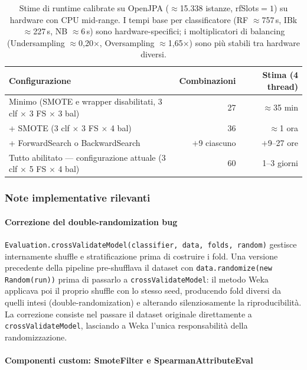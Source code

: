 \begin{table}[h!]
\centering
\small
\begin{tabular}{@{}lrr@{}}
\toprule
\textbf{Configurazione} & \textbf{Combinazioni} & \textbf{Stima (4 thread)} \\
\midrule
Minimo (SMOTE e wrapper disabilitati, 3 clf $\times$ 3 FS $\times$ 3 bal) & 27 & $\approx$35 min \\
+ SMOTE (3 clf $\times$ 3 FS $\times$ 4 bal) & 36 & $\approx$1 ora \\
+ ForwardSearch o BackwardSearch & $+$9 ciascuno & $+$9--27 ore \\
Tutto abilitato --- configurazione attuale (3 clf $\times$ 5 FS $\times$ 4 bal) & 60 & 1--3 giorni \\
\bottomrule
\end{tabular}
\caption{Stime di runtime calibrate su OpenJPA ($\approx$15.338 istanze, rfSlots$=1$) su
hardware con CPU mid-range. I tempi base per classificatore (RF $\approx$757\,s, IBk
$\approx$227\,s, NB $\approx$6\,s) sono hardware-specifici; i moltiplicatori di balancing
(Undersampling $\approx$0{,}20$\times$, Oversampling $\approx$1{,}65$\times$) sono più
stabili tra hardware diversi.}
\end{table}

\subsubsection{Note implementative rilevanti}

\paragraph{Correzione del double-randomization bug}

\texttt{Evaluation.crossValidateModel(classifier, data, folds, random)} gestisce
internamente shuffle e stratificazione prima di costruire i fold. Una versione precedente
della pipeline pre-shufflava il dataset con \texttt{data.randomize(new Random(run))}
prima di passarlo a \texttt{crossValidateModel}: il metodo Weka applicava poi il proprio
shuffle con lo stesso seed, producendo fold diversi da quelli intesi (double-randomization)
e alterando silenziosamente la riproducibilità. La correzione consiste nel passare il
dataset originale direttamente a \texttt{crossValidateModel}, lasciando a Weka l'unica
responsabilità della randomizzazione.

\paragraph{Componenti custom: SmoteFilter e SpearmanAttributeEval}


